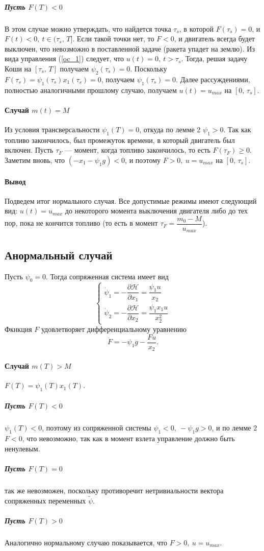 \documentclass[16pt]{article}
\begin{document}
\subparagraph{Пусть $F(T) < 0$} В этом случае можно утверждать, что найдется точка $\tau_s$, в которой 
$F(\tau_s) = 0$, и $F(t) < 0, \ t \in (\tau_s,\,T]$. Если такой точки нет, то $F < 0$, и двигатель всегда 
будет выключен, что невозможно в поставленной задаче (ракета упадет на землю). Из вида управления (\ref{oc_1})
 следует, что $u(t) = 0, \ t > \tau_s$. Тогда, решая задачу Коши на $[\tau_s,\,T]$ получаем $\psi_2(\tau_s) = 0$.
Поскольку $F(\tau_s) = \psi_1(\tau_s)x_1(\tau_s) = 0$, получаем $\psi_1(\tau_s) = 0$. Далее рассуждениями, полностью
 аналогичными прошлому случаю, получаем $u(t) = u_{max}$ на $[0,\,\tau_s]$.
 
\paragraph{Случай $m(t) = M$}
Из условия трансверсальности $\psi_1(T) = 0$, откуда по лемме 2 $\psi_1 > 0$. Так как топливо закончилось, был
промежуток времени, в который двигатель был включен. Пусть $\tau_F$ --- момент, когда топливо закончилось, то есть
$F(\tau_F) \geqslant 0$. Заметим вновь, что $(-x_1 - \psi_1g) < 0$, и поэтому $F > 0,\ u = u_{max}$ 
на $[0,\,\tau_s]$. 

\paragraph{Вывод}
Подведем итог нормального случая. Все допустимые режимы имеют следующий вид: $u(t) = u_{max}$ до некоторого момента 
выключения двигателя либо до тех пор, пока не кончится топливо (то есть в момент $\tau_F = \dfrac{m_0-M}{u_{max}}$).
\subsection{Анормальный случай}
Пусть $\psi_0 = 0$. Тогда сопряженная система имеет вид
\begin{equation}
\begin{cases} \label{1conj_sys2}
\dot{\psi}_1 = -\dfrac{\partial \mathcal{H}}{\partial x_1} = \dfrac{\psi_1u}{x_2}\\
\dot{\psi}_2 = -\dfrac{\partial \mathcal{H}}{\partial x_2} = \dfrac{\psi_1 x_1 u}{x_2^2}
\end{cases}
\end{equation}
Фкнкция $F$ удовлетворяет дифференциальному уравнению
$$\dot{F} = -\psi_1g - \dfrac{Fu}{x_2}.$$

\paragraph{Случай $m(T) > M$} $F(T) = \psi_1(T)x_1(T)$. 
\subparagraph{Пусть $F(T) < 0$} $\psi_1(T) < 0$, поэтому из сопряженной системы $\psi_1 < 0, \ -\psi_1g > 0$,
и по лемме 2 $F < 0$, что невозможно, так как в момент взлета управление должно быть ненулевым.
\subparagraph{Пусть $F(T) = 0$} так же невозможен, поскольку противоречит нетривиальности вектора 
сопряженных переменных $\tilde{\psi}$.
\subparagraph{Пусть $F(T) > 0$} Аналогично нормальному случаю показывается, что $F > 0, \ u = u_{max}$.
\end{document}
